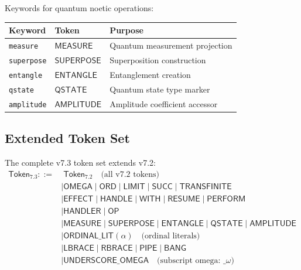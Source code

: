 \begin{definition}
\label{def:quantum-keywords}
Keywords for quantum noetic operations:
\begin{center}
\begin{tabular}{lll}
\toprule
\textbf{Keyword} & \textbf{Token} & \textbf{Purpose} \\
\midrule
\texttt{measure} & $\mathsf{MEASURE}$ & Quantum measurement projection \\
\texttt{superpose} & $\mathsf{SUPERPOSE}$ & Superposition construction \\
\texttt{entangle} & $\mathsf{ENTANGLE}$ & Entanglement creation \\
\texttt{qstate} & $\mathsf{QSTATE}$ & Quantum state type marker \\
\texttt{amplitude} & $\mathsf{AMPLITUDE}$ & Amplitude coefficient accessor \\
\bottomrule
\end{tabular}
\end{center}
\end{definition}

\subsection{Extended Token Set}
\label{subsec:extended-tokens}

\begin{definition}
\label{def:v73-token-set}
The complete v7.3 token set extends v7.2:
\begin{align}
\mathsf{Token}_{7.3} ::=&\; \mathsf{Token}_{7.2} \quad \text{(all v7.2 tokens)} \\
    &\mid \mathsf{OMEGA} \mid \mathsf{ORD} \mid \mathsf{LIMIT} \mid \mathsf{SUCC} \mid \mathsf{TRANSFINITE} \\
    &\mid \mathsf{EFFECT} \mid \mathsf{HANDLE} \mid \mathsf{WITH} \mid \mathsf{RESUME} \mid \mathsf{PERFORM} \\
    &\mid \mathsf{HANDLER} \mid \mathsf{OP} \\
    &\mid \mathsf{MEASURE} \mid \mathsf{SUPERPOSE} \mid \mathsf{ENTANGLE} \mid \mathsf{QSTATE} \mid \mathsf{AMPLITUDE} \\
    &\mid \mathsf{ORDINAL\_LIT}(\alpha) \quad \text{(ordinal literals)} \\
    &\mid \mathsf{LBRACE} \mid \mathsf{RBRACE} \mid \mathsf{PIPE} \mid \mathsf{BANG} \\
    &\mid \mathsf{UNDERSCORE\_OMEGA} \quad \text{(subscript omega: } \texttt{\_}\omega \text{)}
\end{align}
\end{definition}

